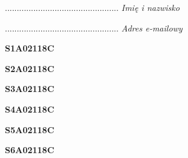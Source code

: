 \begin{turn}{90}\begin{minipage}{\linewidth} \vspace{20mm} ................................................  \textit{Imię i nazwisko}\end{minipage}\end{turn}

\begin{turn}{90}\begin{minipage}{\linewidth} \vspace{20mm} ................................................  \textit{Adres e-mailowy}\end{minipage}\end{turn}

\begin{turn}{90}\huge \begin{minipage}{\linewidth} \vspace{10mm}\textbf{S1A02118C}\end{minipage}\end{turn}

\begin{turn}{90}\huge \begin{minipage}{\linewidth} \vspace{10mm}\textbf{S2A02118C}\end{minipage}\end{turn}

\begin{turn}{90}\huge \begin{minipage}{\linewidth} \vspace{10mm}\textbf{S3A02118C}\end{minipage}\end{turn}

\begin{turn}{90}\huge \begin{minipage}{\linewidth} \vspace{10mm}\textbf{S4A02118C}\end{minipage}\end{turn}

\begin{turn}{90}\huge \begin{minipage}{\linewidth} \vspace{10mm}\textbf{S5A02118C}\end{minipage}\end{turn}

\begin{turn}{90}\huge \begin{minipage}{\linewidth} \vspace{10mm}\textbf{S6A02118C}\end{minipage}\end{turn}

